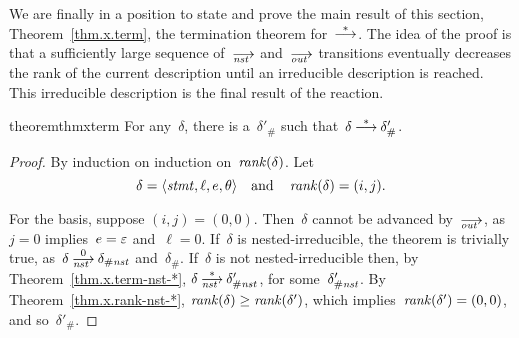 We are finally in a position to state and prove the main result of this
section, Theorem~\ref{thm.x.term}, the termination theorem for~$\trans[*]$.
The idea of the proof is that a sufficiently large sequence of~$\nst$
and~$\out$ transitions eventually decreases the rank of the current
description until an irreducible description is reached.  This irreducible
description is the final result of the reaction.
\begin{restatable}[Termination]{theorem}{thmxterm}
  \label{thm.x.term}
  For any~$\delta$, there is a~$\delta'_\#$ such
  that~$\delta\trans[*]\delta'_\#$.
\end{restatable}
\begin{proof}
  By induction on induction on~$\operatorname{\mathit{rank}}(\delta)$.
  Let
  \[
    \delta=\<\stmt,\ell,e,\theta>
    \quad\text{and}\quad
    \rank(\delta)=(i,j).
  \]

  For the basis, suppose $(i,j)=(0,0)$.  Then~$\delta$ cannot be advanced
  by~$\out$, as~$j=0$ implies~$e=\varepsilon$ and~$\ell=0$.  If~$\delta$ is
  nested-irreducible, the theorem is trivially true,
  as~$\delta\nst[0]\delta_\Hnst$ and~$\delta_\#$.  If~$\delta$ is not
  nested-irreducible then, by Theorem~\ref{thm.x.term-nst-*},
  $\delta\nst[*]\delta'_\Hnst$, for some~$\delta'_{\#\mathit{nst}}$.  By
  Theorem~\ref{thm.x.rank-nst-*}, $\operatorname{\mathit{rank}}(\delta)\ge\operatorname{\mathit{rank}}(\delta')$, which
  implies~$\operatorname{\mathit{rank}}(\delta')=(0,0)$, and so~$\delta'_\#$.


\end{proof}

